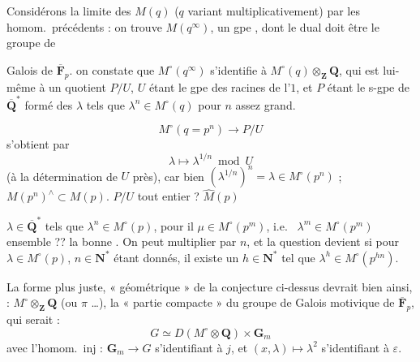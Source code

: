 \documentclass[11pt,a4paper]{article}
\begin{document}
 Considérons la limite  des $M(q)$ ($q$
variant multiplicativement) par les homom.\ précédents : on trouve
$M(q^{\infty})$, un gpe , dont le dual doit être le
groupe de

Galois  de $\overline{\mathbf{F}}_{p}$.
\struck{\ill{} \ill{}}
 
 
on constate que $M^{\circ}(q^{\infty})$ \struck{\ill{}} s'identifie à
\struck{\ill{}} $M^{\circ}(q) \otimes_{\mathbf{Z}} \mathbf{Q}$, qui est
lui-même \ill{} à un quotient $P/U$, $U$ étant le gpe des racines de l'$1$,
et $P$ étant le s-gpe de $\overline{\mathbf{Q}}^{*}$ formé des $\lambda$
tels que $\lambda^{n} \in M^{\circ}(q)$ pour $n$ assez grand.


\[
  M^{\circ}(q = p^{n}) \longrightarrow P/U
\]
s'obtient par
\[
  \lambda \longmapsto \lambda^{1/n} \bmod U
\]
(à la détermination de $U$ \ill{} \ill{} près), car bien
$(\lambda^{1/n})^{n} = \lambda \in M^{\circ}(p^{n})$ ; \ill{}
$M(p^{n})^{\wedge} \subset M(p)$.  $P/U$ tout
entier ? $\hat{M}(p)$ \ill{}

\struck{\ill{}} \ill{} $\lambda \in \overline{\mathbf{Q}}^{*}$ tels que
$\lambda^{n} \in M^{\circ}(p)$,  \ill{} \struck{\ill{}}
pour \ill{} il \ill{} $\mu \in M^{\circ}(p^{m})$, i.e.\ \ill{}
$\lambda^{m} \in M^{\circ}(p^{m})$  ensemble ?? \ill{}
la bonne \ill{} \ill{}. On peut \struck{\ill{} $\lambda$ \ill{}} \ill{}
multiplier par $n$, et la question devient si pour $\lambda \in M^{\circ}(p)$,
$n \in \mathbf{N}^{*}$ étant donnés, il existe un $h \in \mathbf{N}^{*}$
tel que $\lambda^{h} \in M^{\circ}(p^{hn})$.

La forme plus juste, « géométrique » de la conjecture ci-dessus devrait
  bien \ill{} ainsi, \ill{} \ill{}
\ill{} : $M^{\circ} \otimes_{\mathbf{Z}} \mathbf{Q}$ (ou \ill{} $\pi$
\ill{} …), la  « partie compacte » du \struck{\ill{}}
groupe de Galois motivique de $\overline{\mathbf{F}}_{p}$, qui serait
\ill{} \ill{} :
\[
  G \simeq D(M^{\circ} \otimes \mathbf{Q}) \times \mathbf{G}_{m}
\]
avec l'homom.\ inj : $\mathbf{G}_{m} \to G$ s'identifiant à $j$, et
\struck{\ill{}} $(x, \lambda) \mapsto \lambda^{2}$ s'identifiant à
$\varepsilon$.
\end{document}
